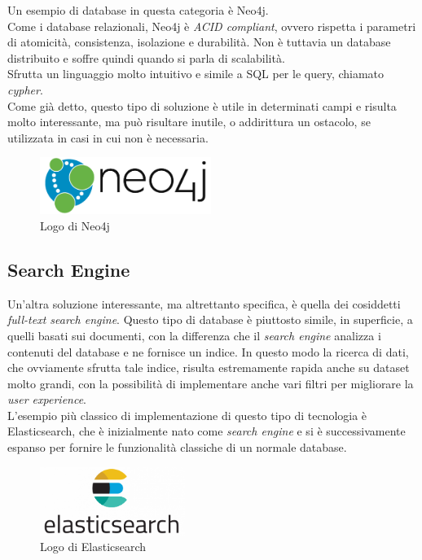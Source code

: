 \noindent Un esempio di database in questa categoria è Neo4j.\\
Come i database relazionali, Neo4j è \textit{ACID compliant}, ovvero rispetta i parametri di atomicità, consistenza, isolazione e durabilità. Non è tuttavia un \gls{database distribuito} e soffre quindi quando si parla di scalabilità.\\
Sfrutta un linguaggio molto intuitivo e simile a \gls{SQL} per le query, chiamato \textit{cypher}.\\

\noindent Come già detto, questo tipo di soluzione è utile in determinati campi e risulta molto interessante, ma può risultare inutile, o addirittura un ostacolo, se utilizzata in casi in cui non è necessaria.

\begin{figure}[htbp]
\begin{center}
\includegraphics[height=5em]{immagini/tecnologies-logos/neo4j-logo.png}
\caption{Logo di Neo4j}
\end{center}
\end{figure}

\subsection{Search Engine}
Un'altra soluzione interessante, ma altrettanto specifica, è quella dei cosiddetti \textit{full-text search engine}. Questo tipo di database è piuttosto simile, in superficie, a quelli basati sui documenti, con la differenza che il \textit{search engine} analizza i contenuti del database e ne fornisce un indice. In questo modo la ricerca di dati, che ovviamente sfrutta tale indice, risulta estremamente rapida anche su dataset molto grandi, con la possibilità di implementare anche vari filtri per migliorare la \textit{user experience}.\\

\noindent L'esempio più classico di implementazione di questo tipo di tecnologia è Elasticsearch, che è inizialmente nato come \textit{search engine} e si è successivamente espanso per fornire le funzionalità classiche di un normale database.

\begin{figure}[htbp]
\begin{center}
\includegraphics[height=6em]{immagini/tecnologies-logos/Elasticsearch-Logo.png}
\caption{Logo di Elasticsearch}
\end{center}
\end{figure}

